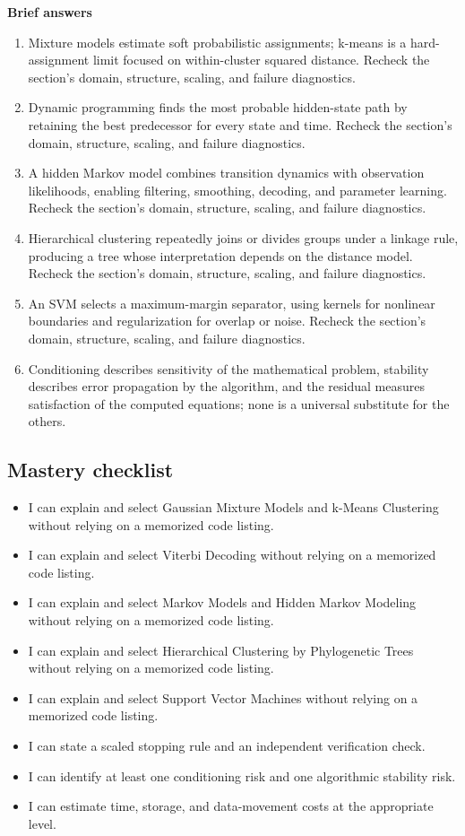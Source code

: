 \documentclass[10pt,letterpaper]{article}
\begin{document}
\textbf{Brief answers}
\begin{enumerate}
\item Mixture models estimate soft probabilistic assignments; k-means is a hard-assignment limit focused on within-cluster squared distance. Recheck the section's domain, structure, scaling, and failure diagnostics.
\item Dynamic programming finds the most probable hidden-state path by retaining the best predecessor for every state and time. Recheck the section's domain, structure, scaling, and failure diagnostics.
\item A hidden Markov model combines transition dynamics with observation likelihoods, enabling filtering, smoothing, decoding, and parameter learning. Recheck the section's domain, structure, scaling, and failure diagnostics.
\item Hierarchical clustering repeatedly joins or divides groups under a linkage rule, producing a tree whose interpretation depends on the distance model. Recheck the section's domain, structure, scaling, and failure diagnostics.
\item An SVM selects a maximum-margin separator, using kernels for nonlinear boundaries and regularization for overlap or noise. Recheck the section's domain, structure, scaling, and failure diagnostics.
\item Conditioning describes sensitivity of the mathematical problem, stability describes error propagation by the algorithm, and the residual measures satisfaction of the computed equations; none is a universal substitute for the others.
\end{enumerate}

\subsection*{Mastery checklist}
\begin{itemize}
\item[$\square$] I can explain and select Gaussian Mixture Models and k-Means Clustering without relying on a memorized code listing.
\item[$\square$] I can explain and select Viterbi Decoding without relying on a memorized code listing.
\item[$\square$] I can explain and select Markov Models and Hidden Markov Modeling without relying on a memorized code listing.
\item[$\square$] I can explain and select Hierarchical Clustering by Phylogenetic Trees without relying on a memorized code listing.
\item[$\square$] I can explain and select Support Vector Machines without relying on a memorized code listing.
\item[$\square$] I can state a scaled stopping rule and an independent verification check.
\item[$\square$] I can identify at least one conditioning risk and one algorithmic stability risk.
\item[$\square$] I can estimate time, storage, and data-movement costs at the appropriate level.
\end{itemize}
\end{document}
